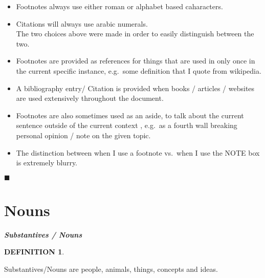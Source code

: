 \documentclass[a4paper,twocolumn,10pt]{article}
\newtheorem{mydef}{DEFINITION}[section]
\newcommand{\theworddefinition}
{ \begin{defn-theword} { \footnotesize \begin{mydef} \end{mydef} } \end{defn-theword}}
\newcommand{\tcolorboxstart}
{\vspace{0.2cm} \centering \nolinenumbers }
\begin{document}
\begin{itemize}[noitemsep]
	\item Footnotes always use either roman or alphabet based caharacters.\\
	\item Citations will always use arabic numerals.\\
		
		The two choices above were made in order to easily distinguish between the two.\\

	\item Footnotes are provided as references for things that are used in only
		once in the current specific instance, e.g.\ some definition that I
		quote from wikipedia.\\
	
	\item A bibliography entry/ Citation is provided
		when books / articles / websites are used extensively throughout the
		document.\\

	\item Footnotes are also sometimes used as an aside, to talk about the
		current sentence outside of the current context , e.g.\ as a  fourth
		wall breaking personal opinion / note on the given topic.\\
		
	\item The distinction between when I use a footnote vs.\ when I use the NOTE
		box is extremely blurry.\\

\end{itemize}




\nolinenumbers \vspace{0.2cm}
\begin{center} $\blacksquare$ \end{center}
\linenumbers

\clearpage

\linenumbers


\section{{Nouns}}
\label{sec:nouns}

\tcolorboxstart
\begin{defn-bg}

	\begin{defn-title}[width=7cm]{}
		{\normalsize \textbf{\textit{Substantives / Nouns}} }
	\end{defn-title}

	\theworddefinition

	\begin{defn-content}
		\justify
		Substantives/Nouns are people, animals, things, concepts and ideas.
	\end{defn-content}

\end{defn-bg}
\end{document}
